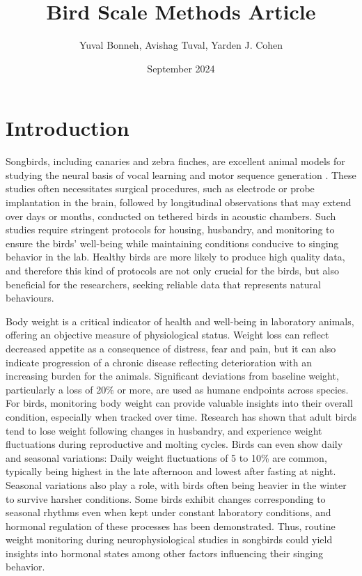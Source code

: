 \documentclass{article}
\title{Bird Scale Methods Article}
\author{Yuval Bonneh, Avishag Tuval, Yarden J. Cohen}
\date{September 2024}
\begin{document}
\maketitle

\section{Introduction}
Songbirds, including canaries and zebra finches, are excellent animal models for studying the neural basis of vocal learning and motor sequence generation \cite{cohen2020hidden,fee2012oculomotor,long2010support}. These studies often necessitates surgical procedures, such as electrode or probe implantation in the brain, followed by longitudinal observations that may extend over days or months, conducted on tethered birds in acoustic chambers\cite{yamahachi2017welfare}. Such studies require stringent protocols for housing, husbandry, and monitoring to ensure the birds' well-being while maintaining conditions conducive to singing behavior in the lab\cite{schmidt2010iacuc}. Healthy birds are more likely to produce high quality data, and therefore this kind of protocols are not only crucial for the birds, but also beneficial for the researchers, seeking reliable data that represents natural behaviours. 

Body weight is a critical indicator of health and well-being in laboratory animals, offering an objective measure of physiological status\cite{morton1985guidelines}. Weight loss can reflect decreased appetite as a consequence of distress, fear and pain, but it can also indicate progression of a chronic disease reflecting deterioration with an increasing burden for the animals\cite{talbot2020defining}. Significant deviations from baseline weight, particularly a loss of 20\% or more, are used as humane endpoints across species\cite{morton1985guidelines}. For birds, monitoring body weight can provide valuable insights into their overall condition, especially when tracked over time. Research has shown that adult birds tend to lose weight following changes in husbandry\cite{yamahachi2017welfare}, and experience weight fluctuations during reproductive and molting cycles\cite{clark1979body}. Birds can even show daily and seasonal variations: Daily weight fluctuations of 5 to 10\% are common, typically being highest in the late afternoon and lowest after fasting at night\cite{lehikoinen1987seasonality}. Seasonal variations also play a role, with birds often being heavier in the winter to survive harsher conditions\cite{clark1979body}. Some birds exhibit changes corresponding to seasonal rhythms even when kept under constant laboratory conditions\cite{yamahachi2017welfare}, and hormonal regulation of these processes has been demonstrated\cite{hintz2000hormonal}. Thus, routine weight monitoring during neurophysiological studies in songbirds could yield insights into hormonal states among other factors influencing their singing behavior.
\end{document}
